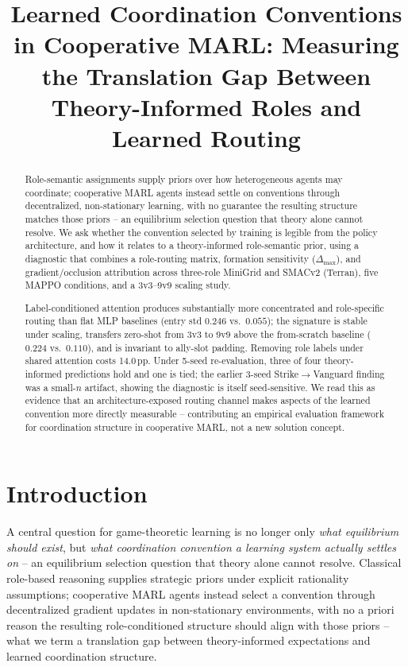 \documentclass{nextgame2026}
\title[Translation Gap in Cooperative MARL]
{Learned Coordination Conventions in Cooperative MARL:
Measuring the Translation Gap Between Theory-Informed Roles and Learned Routing}
\begin{document}
\maketitle


\begin{abstract}
Role-semantic assignments supply priors over how heterogeneous agents may coordinate; cooperative MARL agents instead settle on conventions through decentralized, non-stationary learning, with no guarantee the resulting structure matches those priors -- an equilibrium selection question that theory alone cannot resolve. We ask whether the convention selected by training is legible from the policy architecture, and how it relates to a theory-informed role-semantic prior, using a diagnostic that combines a role-routing matrix, formation sensitivity ($\Delta_{\max}$), and gradient/occlusion attribution across three-role MiniGrid and SMACv2 (Terran), five MAPPO conditions, and a 3v3--9v9 scaling study.

Label-conditioned attention produces substantially more concentrated and role-specific routing than flat MLP baselines (entry std $0.246$ vs.\ $0.055$); the signature is stable under scaling, transfers zero-shot from 3v3 to 9v9 above the from-scratch baseline ($0.224$ vs.\ $0.110$), and is invariant to ally-slot padding. Removing role labels under shared attention costs 14.0\,pp. Under 5-seed re-evaluation, three of four theory-informed predictions hold and one is tied; the earlier 3-seed Strike$\to$Vanguard finding was a small-$n$ artifact, showing the diagnostic is itself seed-sensitive. We read this as evidence that an architecture-exposed routing channel makes aspects of the learned convention more directly measurable -- contributing an empirical evaluation framework for coordination structure in cooperative MARL, not a new solution concept.
\end{abstract}

\section{Introduction}
\label{sec:introduction}

A central question for game-theoretic learning is no longer only \emph{what equilibrium should exist}, but \emph{what coordination convention a learning system actually settles on} -- an equilibrium selection question that theory alone cannot resolve. Classical role-based reasoning supplies strategic priors under explicit rationality assumptions; cooperative MARL agents instead select a convention through decentralized gradient updates in non-stationary environments, with no a priori reason the resulting role-conditioned structure should align with those priors -- what we term a translation gap between theory-informed expectations and learned coordination structure.
\end{document}
